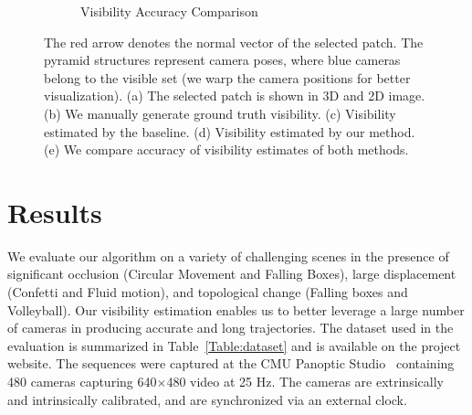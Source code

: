 \begin{figure}[t]
\begin{subfigure}{0.4\textwidth}
		\caption{Visibility Accuracy Comparison}
	\end{subfigure}
	\caption{The red arrow denotes the normal vector of the selected patch. The pyramid structures represent camera poses, where blue cameras belong to the visible set (we warp the camera positions for better visualization). (a) The selected patch is shown in 3D and 2D image. (b) We manually generate ground truth visibility. (c) Visibility estimated by the baseline. (d) Visibility estimated by our method. (e) We compare accuracy of visibility estimates of both methods.} 
	\label{Fig:visibilityError}
\end{figure}


\section{Results}






We evaluate our algorithm on a variety of challenging scenes in the presence of significant occlusion (Circular Movement and Falling Boxes), large displacement (Confetti and Fluid motion), and topological change (Falling boxes and Volleyball). Our visibility estimation enables us to better leverage a large number of cameras in producing accurate and long trajectories. The dataset used in the evaluation is summarized in Table~\ref{Table:dataset} and is available on the project website. The sequences were captured at the CMU Panoptic Studio~\cite{PanopticStudio2014} containing 480 cameras capturing 640$\times$480 video at 25 Hz. The cameras are extrinsically and intrinsically calibrated, and are synchronized via an external clock.


